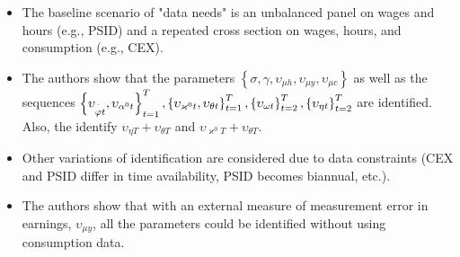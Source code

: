 \documentclass[notes=show]{beamer}
\begin{document}
\bigskip

\begin{frame}%


\begin{itemize}
\item The baseline scenario of "data needs" is an unbalanced panel on wages
and hours (e.g., PSID) and a repeated cross section on wages, hours, and
consumption (e.g., CEX).

\item The authors show that the parameters $\left\{ \sigma ,\gamma ,\upsilon
_{\mu h},\upsilon _{\mu y},\upsilon _{\mu c}\right\} $ as well as the
sequences $\left\{ \upsilon _{\overset{\symbol{94}}{\varphi }t},\upsilon
_{\alpha ^{0}t}\right\} _{t=1}^{T},\left\{ \upsilon _{\varkappa
^{0}t},\upsilon _{\theta t}\right\} _{t=1}^{T},\left\{ \upsilon _{\omega
t}\right\} _{t=2}^{T},\left\{ \upsilon _{\eta t}\right\} _{t=2}^{T}$ are
identified. Also, the identify $\upsilon _{\eta T}+\upsilon _{\theta T}$ and 
$\upsilon _{\varkappa ^{0}T}+\upsilon _{\theta T}$.

\item Other variations of identification are considered due to data
constraints (CEX and PSID differ in time availability, PSID becomes
biannual, etc.).

\item The authors show that with an external measure of measurement error in
earnings, $\upsilon _{\mu y}$, all the parameters could be identified
without using consumption data.
\end{itemize}

\transboxout%
\end{frame}%

\bigskip
\end{document}
